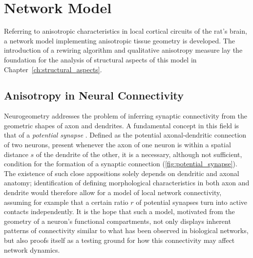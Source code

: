 \chapter{Network Model}\label{ch:Network Model} 

Referring to anisotropic characteristics in local cortical circuits of
the rat's brain, a network model implementing anisotropic tissue
geometry is developed. The introduction of a rewiring algorithm and
qualitative anisotropy measure %
lay the foundation for the analysis of structural aspects of this
model in Chapter~\ref{ch:structural_aspects}.

\clearpage




\section{Anisotropy in Neural Connectivity}
\label{sec:biol_anisotropy}

Neurogeometry addresses the problem of inferring
synaptic connectivity from the geometric shapes of axon and
dendrites. A fundamental concept in this field is that of a
\textit{potential synapse}
\parencite{Stepanyants2002}. Defined as the potential axonal-dendritic
connection of two neurons, present whenever the axon of one neuron is
within a spatial distance $s$ of the dendrite of the other, it is a
necessary, although not sufficient, condition for the formation of a
synaptic connection (\autoref{fig:potential_synapse}). The existence
of such close appositions solely depends on dendritic and axonal
anatomy; identification of defining morphological characteristics in
both axon and dendrite would therefore allow for a model of local
network connectivity, assuming for example that a certain ratio $r$ of
potential synapses turn into active contacts independently. It is the
hope that such a model, motivated from the geometry of a neuron's
functional compartments, not only displays inherent patterns of
connectivity similar to what has been observed in biological networks,
but also proofs itself as a testing ground for how this connectivity
may affect network dynamics.

